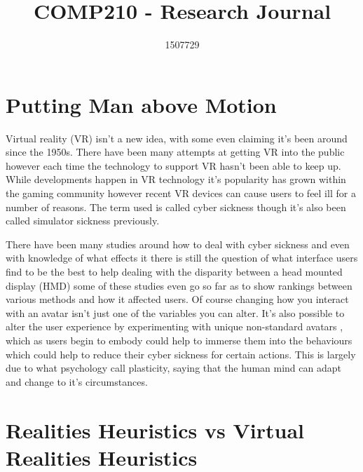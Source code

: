 \documentclass{scrartcl}
\title{COMP210 - Research Journal}
\author{1507729}
\begin{document}
\maketitle

\section{Putting Man above Motion}

Virtual reality (VR) isn't a new idea, with some even claiming it's been around since the 1950s. \cite{vrs2017origin} There have been many attempts at getting VR into the public however each time the technology to support VR hasn't been able to keep up. While developments happen in VR technology it's popularity has grown within the gaming community however recent VR devices can cause users to feel ill for a number of reasons. \cite{porcino2017minimizing} The term used is called cyber sickness though it's also been called simulator sickness \cite{gower1989simulator} previously.

There have been many studies around how to deal with cyber sickness and even with knowledge of what effects it there is still the question of what interface users find to be the best to help dealing with the disparity between a head mounted display (HMD) some of these studies even go so far as to show rankings between various methods and how it affected users. \cite{benzeroual2013cyber, mentzelopoulos2015hardware} Of course changing how you interact with an avatar isn't just one of the variables you can alter. It's also possible to alter the user experience by experimenting with unique non-standard avatars \cite{won2015homuncular}, which as users begin to embody could help to immerse them into the behaviours which could help to reduce their cyber sickness for certain actions. This is largely due to what psychology call plasticity, saying that the human mind can adapt and change to it's circumstances. \cite{madary2016real}

\section{Realities Heuristics vs Virtual Realities Heuristics}
\end{document}
